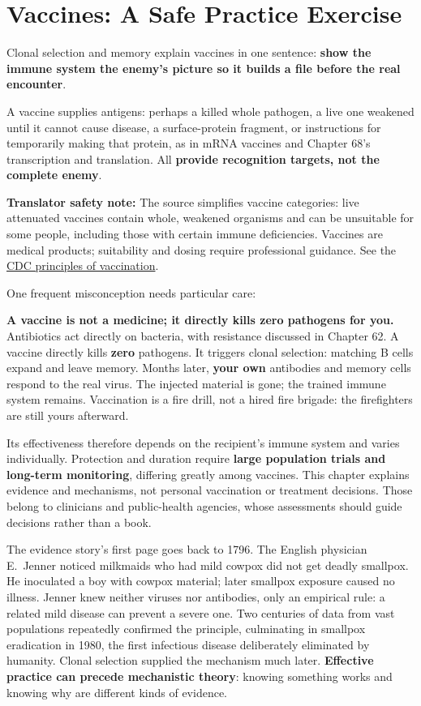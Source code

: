\section{Vaccines: A Safe Practice Exercise}

Clonal selection and memory explain vaccines in one sentence: \textbf{show the immune system the enemy's picture so it builds a file before the real encounter}.

A vaccine supplies antigens: perhaps a killed whole pathogen, a live one weakened until it cannot cause disease, a surface-protein fragment, or instructions for temporarily making that protein, as in mRNA vaccines and Chapter 68's transcription and translation. All \textbf{provide recognition targets, not the complete enemy}.

\textbf{Translator safety note:} The source simplifies vaccine categories: live attenuated vaccines contain whole, weakened organisms and can be unsuitable for some people, including those with certain immune deficiencies. Vaccines are medical products; suitability and dosing require professional guidance. See the \href{https://www.cdc.gov/pinkbook/hcp/table-of-contents/chapter-1-principles-of-vaccination.html}{CDC principles of vaccination}.

One frequent misconception needs particular care:

\textbf{A vaccine is not a medicine; it directly kills zero pathogens for you.} Antibiotics act directly on bacteria, with resistance discussed in Chapter 62. A vaccine directly kills \textbf{zero} pathogens. It triggers clonal selection: matching B cells expand and leave memory. Months later, \textbf{your own} antibodies and memory cells respond to the real virus. The injected material is gone; the trained immune system remains. Vaccination is a fire drill, not a hired fire brigade: the firefighters are still yours afterward.

Its effectiveness therefore depends on the recipient's immune system and varies individually. Protection and duration require \textbf{large population trials and long-term monitoring}, differing greatly among vaccines. This chapter explains evidence and mechanisms, not personal vaccination or treatment decisions. Those belong to clinicians and public-health agencies, whose assessments should guide decisions rather than a book.

The evidence story's first page goes back to 1796. The English physician E.~Jenner noticed milkmaids who had mild cowpox did not get deadly smallpox. He inoculated a boy with cowpox material; later smallpox exposure caused no illness. Jenner knew neither viruses nor antibodies, only an empirical rule: a related mild disease can prevent a severe one. Two centuries of data from vast populations repeatedly confirmed the principle, culminating in smallpox eradication in 1980, the first infectious disease deliberately eliminated by humanity. Clonal selection supplied the mechanism much later. \textbf{Effective practice can precede mechanistic theory}: knowing something works and knowing why are different kinds of evidence.

